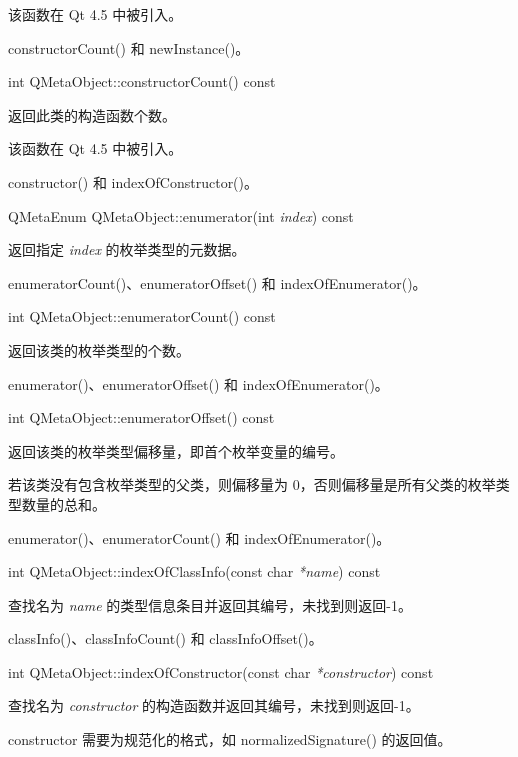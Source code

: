 该函数在 Qt 4.5 中被引入。

\begin{seeAlso}
constructorCount() 和 newInstance()。
\end{seeAlso}

int QMetaObject::constructorCount() const

返回此类的构造函数个数。

该函数在 Qt 4.5 中被引入。

\begin{seeAlso}
constructor() 和 indexOfConstructor()。
\end{seeAlso}

QMetaEnum QMetaObject::enumerator(int \emph{index}) const

返回指定 \emph{index} 的枚举类型的元数据。

\begin{seeAlso}
enumeratorCount()、enumeratorOffset() 和 indexOfEnumerator()。
\end{seeAlso}

int QMetaObject::enumeratorCount() const

返回该类的枚举类型的个数。

\begin{seeAlso}
enumerator()、enumeratorOffset() 和 indexOfEnumerator()。
\end{seeAlso}
	
int QMetaObject::enumeratorOffset() const

返回该类的枚举类型偏移量，即首个枚举变量的编号。

若该类没有包含枚举类型的父类，则偏移量为 0，否则偏移量是所有父类的枚举类型数量的总和。

\begin{seeAlso}
enumerator()、enumeratorCount() 和 indexOfEnumerator()。
\end{seeAlso}

int QMetaObject::indexOfClassInfo(const char \emph{*name}) const

查找名为 \emph{name} 的类型信息条目并返回其编号，未找到则返回-1。

\begin{seeAlso}
classInfo()、classInfoCount() 和 classInfoOffset()。
\end{seeAlso}

int QMetaObject::indexOfConstructor(const char \emph{*constructor}) const

查找名为 \emph{constructor} 的构造函数并返回其编号，未找到则返回-1。

\begin{notice}
constructor 需要为规范化的格式，如 normalizedSignature() 的返回值。
\end{notice}

